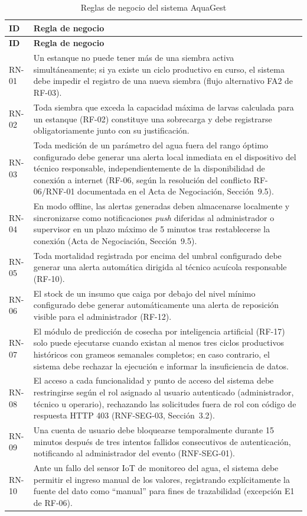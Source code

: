 \documentclass[12pt,a4paper]{article}
\begin{document}
\begin{longtable}{|p{1.6cm}|p{11.4cm}|}
\caption{Reglas de negocio del sistema AquaGest} \\
\hline
\textbf{ID} & \textbf{Regla de negocio} \\
\hline
\endfirsthead
\hline
\textbf{ID} & \textbf{Regla de negocio} \\
\hline
\endhead
RN-01 & Un estanque no puede tener más de una siembra activa simultáneamente;
si ya existe un ciclo productivo en curso, el sistema debe impedir el registro
de una nueva siembra (flujo alternativo FA2 de RF-03). \\ \hline
RN-02 & Toda siembra que exceda la capacidad máxima de larvas calculada para
un estanque (RF-02) constituye una sobrecarga y debe registrarse
obligatoriamente junto con su justificación. \\ \hline
RN-03 & Toda medición de un parámetro del agua fuera del rango óptimo
configurado debe generar una alerta local inmediata en el dispositivo del
técnico responsable, independientemente de la disponibilidad de conexión a
internet (RF-06, según la resolución del conflicto RF-06/RNF-01 documentada en
el Acta de Negociación, Sección~9.5). \\ \hline
RN-04 & En modo offline, las alertas generadas deben almacenarse localmente y
sincronizarse como notificaciones \textit{push} diferidas al administrador o
supervisor en un plazo máximo de 5 minutos tras restablecerse la conexión
(Acta de Negociación, Sección~9.5). \\ \hline
RN-05 & Toda mortalidad registrada por encima del umbral configurado debe
generar una alerta automática dirigida al técnico acuícola responsable
(RF-10). \\ \hline
RN-06 & El stock de un insumo que caiga por debajo del nivel mínimo configurado
debe generar automáticamente una alerta de reposición visible para el
administrador (RF-12). \\ \hline
RN-07 & El módulo de predicción de cosecha por inteligencia artificial (RF-17)
solo puede ejecutarse cuando existan al menos tres ciclos productivos
históricos con grameos semanales completos; en caso contrario, el sistema debe
rechazar la ejecución e informar la insuficiencia de datos. \\ \hline
RN-08 & El acceso a cada funcionalidad y punto de acceso del sistema debe
restringirse según el rol asignado al usuario autenticado (administrador,
técnico u operario), rechazando las solicitudes fuera de rol con código de
respuesta HTTP 403 (RNF-SEG-03, Sección~3.2). \\ \hline
RN-09 & Una cuenta de usuario debe bloquearse temporalmente durante 15 minutos
después de tres intentos fallidos consecutivos de autenticación, notificando
al administrador del evento (RNF-SEG-01). \\ \hline
RN-10 & Ante un fallo del sensor IoT de monitoreo del agua, el sistema debe
permitir el ingreso manual de los valores, registrando explícitamente la
fuente del dato como ``manual'' para fines de trazabilidad (excepción E1 de
RF-06). \\ \hline
\end{longtable}
\end{document}

